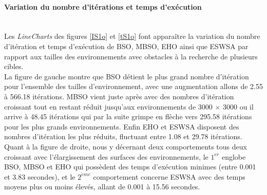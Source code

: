 \noindent
\begin{minipage}[t]{1\textwidth}
	\paragraph{Variation du nombre d'itérations et temps d'exécution}
	\textbf{ }\\
	
	Les \textit{LineCharts} des figures \ref{IS1o} et \ref{tS1o} font apparaître la variation du nombre d'itération et temps d'exécution de BSO, MBSO, EHO ainsi que ESWSA par rapport aux tailles des environnements avec obstacles à la recherche de plusieurs cibles.\\
	
	La figure de gauche montre que BSO détient le plus grand nombre d'itération pour l'ensemble des tailles d'environnement, avec une augmentation allons de 2.55 à 566.18 itérations. MBSO vient juste après avec des nombres d'itération croissant tout en restant réduit jusqu'aux environnements de 3000 $\times$ 3000 ou il arrive à 48.45 itérations qui par la suite grimpe en flèche vers 295.58 itérations pour les plus grands environnements.
	Enfin EHO et ESWSA disposent des nombres d'itération les plus réduits, fluctuant entre 1.08 et 29.78 itérations.\\
	
	Quant à la figure de droite, nous y décernant deux comportements tous deux croissant avec l'élargissement des surfaces des environnements, le $1^{er}$ englobe BSO, MBSO et EHO qui possèdent des temps d'exécution minimes (entre 0.001 et 3.83 secondes), et le $2^{\grave{e}me}$ comportement concerne ESWSA avec des temps moyens plus ou moins élevés, allant de 0.001 à 15.56 secondes.
\end{minipage}



\noindent
\begin{minipage}[t]{0.55\textwidth}
	\captionsetup{width=0.8\linewidth}
	\centering{}
	\label{IS1o}
\end{minipage}\hfill
\hspace{-0.5cm}
\begin{minipage}[t]{0.55\textwidth}
	\captionsetup{width=0.8\linewidth}
	\centering{}
	\label{tS1o}
\end{minipage}\hfill


